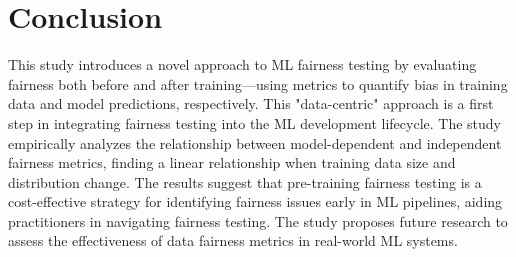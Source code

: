 \documentclass[sigconf,review]{acmart}
\begin{document}
\section{Conclusion}

This study introduces a novel approach to ML fairness testing by
evaluating fairness both before and after training---using metrics to
quantify bias in training data and model predictions, respectively.
This "data-centric" approach is a first step in integrating fairness
testing into the ML development lifecycle. The study empirically
analyzes the relationship between model-dependent and independent
fairness metrics, finding a linear relationship when training data
size and distribution change. The results suggest that pre-training
fairness testing is a cost-effective strategy for identifying fairness
issues early in ML pipelines, aiding practitioners in navigating
fairness testing. The study proposes future research to assess the
effectiveness of data fairness metrics in real-world ML systems.


\end{document}
